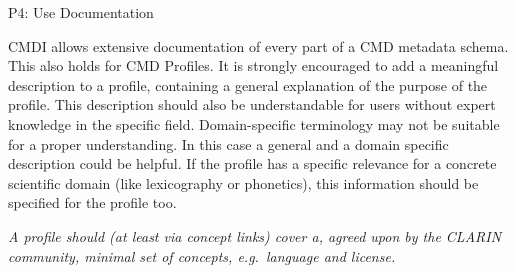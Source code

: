 P4: Use Documentation

 

CMDI allows extensive documentation of every part of a CMD metadata schema. This also holds for CMD Profiles. It is strongly encouraged to add a meaningful description to a profile, containing a general explanation of the purpose of the profile. This description should also be understandable for users without expert knowledge in the specific field. Domain-specific terminology may not be suitable for a proper
understanding. In this case a general and a domain specific description could be helpful. If the profile has a specific relevance for a concrete scientific domain (like lexicography or phonetics), this information should be specified for the profile too.

\begin{workinprogress}

 

\emph{A profile should (at least via concept links) cover a, agreed upon by the CLARIN community, minimal set of concepts, e.g.~language and license.}

\end{workinprogress}